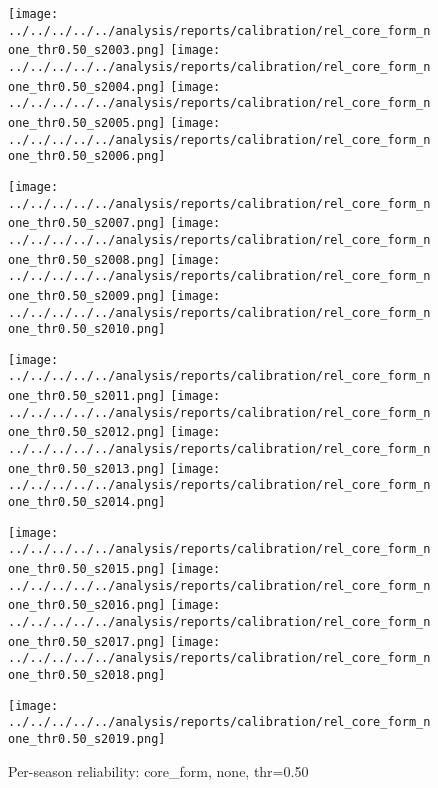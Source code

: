 \begin{figure}[t]
  \centering
  \caption[Per-season reliability: core_form, none, thr=0.50]{Per-season reliability: core_form, none, thr=0.50}
  \texttt{[image: ../../../../../analysis/reports/calibration/rel\_core\_form\_none\_thr0.50\_s2003.png]}
  \texttt{[image: ../../../../../analysis/reports/calibration/rel\_core\_form\_none\_thr0.50\_s2004.png]}
  \texttt{[image: ../../../../../analysis/reports/calibration/rel\_core\_form\_none\_thr0.50\_s2005.png]}
  \texttt{[image: ../../../../../analysis/reports/calibration/rel\_core\_form\_none\_thr0.50\_s2006.png]}
  \par\vspace{2pt}
  \texttt{[image: ../../../../../analysis/reports/calibration/rel\_core\_form\_none\_thr0.50\_s2007.png]}
  \texttt{[image: ../../../../../analysis/reports/calibration/rel\_core\_form\_none\_thr0.50\_s2008.png]}
  \texttt{[image: ../../../../../analysis/reports/calibration/rel\_core\_form\_none\_thr0.50\_s2009.png]}
  \texttt{[image: ../../../../../analysis/reports/calibration/rel\_core\_form\_none\_thr0.50\_s2010.png]}
  \par\vspace{2pt}
  \texttt{[image: ../../../../../analysis/reports/calibration/rel\_core\_form\_none\_thr0.50\_s2011.png]}
  \texttt{[image: ../../../../../analysis/reports/calibration/rel\_core\_form\_none\_thr0.50\_s2012.png]}
  \texttt{[image: ../../../../../analysis/reports/calibration/rel\_core\_form\_none\_thr0.50\_s2013.png]}
  \texttt{[image: ../../../../../analysis/reports/calibration/rel\_core\_form\_none\_thr0.50\_s2014.png]}
  \par\vspace{2pt}
  \texttt{[image: ../../../../../analysis/reports/calibration/rel\_core\_form\_none\_thr0.50\_s2015.png]}
  \texttt{[image: ../../../../../analysis/reports/calibration/rel\_core\_form\_none\_thr0.50\_s2016.png]}
  \texttt{[image: ../../../../../analysis/reports/calibration/rel\_core\_form\_none\_thr0.50\_s2017.png]}
  \texttt{[image: ../../../../../analysis/reports/calibration/rel\_core\_form\_none\_thr0.50\_s2018.png]}
  \par\vspace{2pt}
  \texttt{[image: ../../../../../analysis/reports/calibration/rel\_core\_form\_none\_thr0.50\_s2019.png]}

\end{figure}
